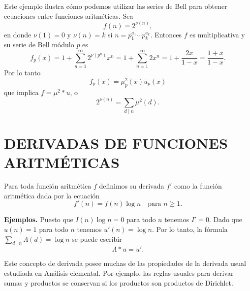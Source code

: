 \documentclass[12pt,a4paper]{book}
\begin{document}
    \begin{ejemplo}
        Este ejemplo ilustra cómo podemos utilizar las series de Bell para obtener
        ecuaciones entre funciones aritméticas. Sea
        \begin{equation*}
            f(n)=2^{\nu(n)},
        \end{equation*}
        en donde $\nu(1)=0$ y $\nu(n)=k$ si $n=p_1^{a_1}\cdots p_k^{a_k}$. Entonces $f$ es
        multiplicativa y su serie de Bell módulo $p$ es
        \begin{equation*}
            f_p(x)=1+\sum_{n=1}^{\infty}2^{\nu(p^n)}x^n=1+\sum_{n=1}^{\infty}2x^n
            =1+\frac{2x}{1-x}=\frac{1+x}{1-x}.
        \end{equation*}
        Por lo tanto
        \begin{equation*}
            f_p(x)=\mu_p^2(x)u_p(x)
        \end{equation*}
        que implica $f=\mu^2*u$, o
        \begin{equation*}
            2^{\nu(n)}=\sum_{d\mid n}\mu^2(d).
        \end{equation*}
    \end{ejemplo}

    \section{DERIVADAS DE FUNCIONES ARITMÉTICAS}

    \begin{definicion}
        Para toda función aritmética $f$ definimos su derivada $f'$ como la función
        aritmética dada por la ecuación
        \begin{equation*}
            f'(n)=f(n)\log n\quad\text{para } n\geq1.
        \end{equation*}
    \end{definicion}

    \textbf{Ejemplos.} Puesto que $I(n)\log n=0$ para todo $n$ tenemos $I'=0$. Dado que
    $u(n)=1$ para todo $n$ tenemos $u'(n)=\log n$. Por lo tanto, la fórmula
    $\sum_{d\mid n}\Lambda(d)=\log n$ se puede escribir
    \begin{equation}
        \Lambda*u=u'.
    \end{equation}

    Este concepto de derivada posee muchas de las propiedades de la derivada usual
    estudiada en Análisis elemental. Por ejemplo, las reglas usuales para derivar sumas y
    productos se conservan si los productos son productos de Dirichlet.
\end{document}
